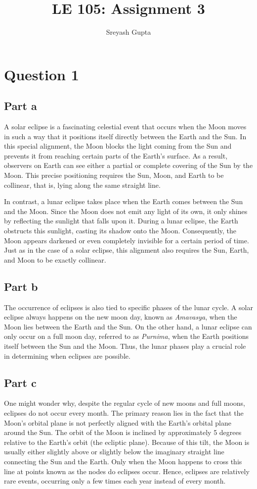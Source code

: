 \documentclass{article}
\title{LE 105: Assignment 3}
\author{Sreyash Gupta}
\begin{document}
\maketitle

\section*{Question 1}
\subsection*{Part a}
A solar eclipse is a fascinating celestial event that occurs when the Moon moves in such a way that it positions itself directly between the Earth and the Sun. In this special alignment, the Moon blocks the light coming from the Sun and prevents it from reaching certain parts of the Earth’s surface. As a result, observers on Earth can see either a partial or complete covering of the Sun by the Moon. This precise positioning requires the Sun, Moon, and Earth to be collinear, that is, lying along the same straight line.  

In contrast, a lunar eclipse takes place when the Earth comes between the Sun and the Moon. Since the Moon does not emit any light of its own, it only shines by reflecting the sunlight that falls upon it. During a lunar eclipse, the Earth obstructs this sunlight, casting its shadow onto the Moon. Consequently, the Moon appears darkened or even completely invisible for a certain period of time. Just as in the case of a solar eclipse, this alignment also requires the Sun, Earth, and Moon to be exactly collinear.

\subsection*{Part b}
The occurrence of eclipses is also tied to specific phases of the lunar cycle. A solar eclipse always happens on the new moon day, known as \textit{Amavasya}, when the Moon lies between the Earth and the Sun. On the other hand, a lunar eclipse can only occur on a full moon day, referred to as \textit{Purnima}, when the Earth positions itself between the Sun and the Moon. Thus, the lunar phases play a crucial role in determining when eclipses are possible.

\subsection*{Part c}
One might wonder why, despite the regular cycle of new moons and full moons, eclipses do not occur every month. The primary reason lies in the fact that the Moon’s orbital plane is not perfectly aligned with the Earth’s orbital plane around the Sun. The orbit of the Moon is inclined by approximately 5 degrees relative to the Earth’s orbit (the ecliptic plane). Because of this tilt, the Moon is usually either slightly above or slightly below the imaginary straight line connecting the Sun and the Earth. Only when the Moon happens to cross this line at points known as the nodes do eclipses occur. Hence, eclipses are relatively rare events, occurring only a few times each year instead of every month.
\end{document}
